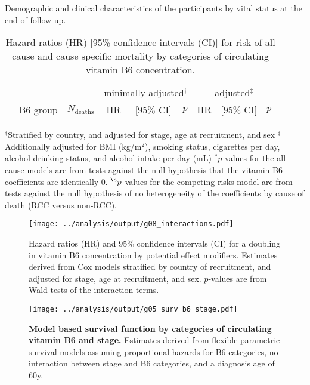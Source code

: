 \documentclass[a4paper,10pt]{article}
\begin{document}
\begin{table}
\caption{Demographic and clinical characteristics of the participants by vital 
status at the end of follow-up.}
\centering

\end{table}

\clearpage 
\begin{table}
\caption{Hazard ratios (HR) [95\% confidence intervals (CI)] for risk of all 
cause and cause specific mortality by categories of circulating vitamin B6 
concentration.}
\begin{tabular}{lrrrrrrrr}
\toprule
& & &\multicolumn{3}{c}{minimally adjusted$^\dag$} & 
\multicolumn{3}{c}{adjusted$^\ddag$} \\
 \cmidrule(r){4-6} \cmidrule(l){7-9} 
& B6 group & $N_{\text{deaths}}$ & HR & [95\% CI] & $p$ & HR & [95\% CI] & 
$p$ \\
\midrule

\bottomrule
\end{tabular}
\newline
{\footnotesize 
$^\dag$Stratified by country, and adjusted for stage, age at recruitment, and 
sex \newline
$^\ddag$Additionally adjusted for BMI (kg/m$^2$), smoking status, cigarettes 
per day, alcohol drinking status, and alcohol intake per day (mL) \newline
$^*p$-values for the all-cause models are from tests against the null 
hypothesis that the vitamin B6 coefficients are identically 0. 
\newline
$^{\S}p$-values for the competing risks model are from tests against the null 
hypothesis of no heterogeneity of the coefficients by cause of death (RCC 
versus non-RCC).
}
\end{table}
\clearpage

\begin{figure}
 \centering
\caption{Hazard ratios (HR) and 95\% confidence intervals (CI) for a 
doubling in vitamin B6 concentration by potential effect modifiers. 
\footnotesize{Estimates derived from Cox models stratified by country of 
recruitment, and adjusted for stage, age at recruitment, and sex. $p$-values 
are from Wald tests of the interaction terms.}}
\texttt{[image: ../analysis/output/g08\_interactions.pdf]}
\end{figure}


\begin{figure}
 \centering 
\caption{\textbf{Model based survival function by categories of 
circulating 
vitamin B6 and stage.} \footnotesize{Estimates derived from flexible 
parametric survival models assuming proportional hazards for B6 categories, no 
interaction between stage and B6 categories, and a diagnosis age of 60y.}} 
\texttt{[image: ../analysis/output/g05\_surv\_b6\_stage.pdf]}
\end{figure}
\end{document}
